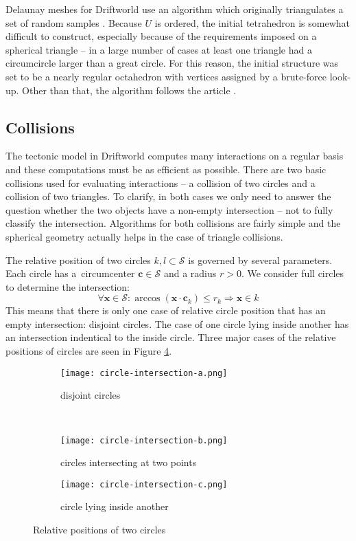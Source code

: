 Delaunay meshes for Driftworld use an algorithm which originally triangulates a set of random samples \cite{ma}. Because $U$ is ordered, the initial tetrahedron is somewhat difficult to construct, especially because of the requirements imposed on a spherical triangle -- in a large number of cases at least one triangle had a circumcircle larger than a great circle. For this reason, the initial structure was set to be a nearly regular octahedron with vertices assigned by a brute-force look-up. Other than that, the algorithm follows the article \cite{ma}.
\subsection{Collisions}
The tectonic model in Driftworld computes many interactions on a regular basis and these computations must be as efficient as possible. There are two basic collisions used for evaluating interactions -- a collision of two circles and a collision of two triangles. To clarify, in both cases we only need to answer the question whether the two objects have a non-empty intersection -- not to fully classify the intersection. Algorithms for both collisions are fairly simple and the spherical geometry actually helps in the case of triangle collisions.

The relative position of two circles $k,l\subset\mathcal{S}$ is governed by several parameters. Each circle has a~circumcenter $\mathbf{c} \in \mathcal{S}$ and a radius $r > 0$. We consider full circles to determine the intersection:
$$\forall\mathbf{x}\in\mathcal{S}:\arccos(\mathbf{x}\cdot\mathbf{c}_k) \le r_k\Rightarrow\mathbf{x}\in k$$
This means that there is only one case of relative circle position that has an empty intersection: disjoint circles. The case of one circle lying inside another has an intersection indentical to the inside circle. Three major cases of the relative positions of circles are seen in Figure \ref{fig:circle-collisions}.
\begin{figure}[ht]
\centering
\begin{subfigure}{7cm}
\texttt{[image: circle-intersection-a.png]}
\caption{disjoint circles}
\label{fig:disjoint-circles}
\end{subfigure}\\
\begin{subfigure}{7cm}
\texttt{[image: circle-intersection-b.png]}
\caption{circles intersecting at two points}
\label{fig:circles-intersecting-at-two-points}
\end{subfigure}
\hspace*{1cm}
\begin{subfigure}{7cm}
\texttt{[image: circle-intersection-c.png]}
\caption{circle lying inside another}
\label{fig:circle-lying-inside-another}
\end{subfigure}
\caption{Relative positions of two circles}
\label{fig:circle-collisions}
\end{figure}


